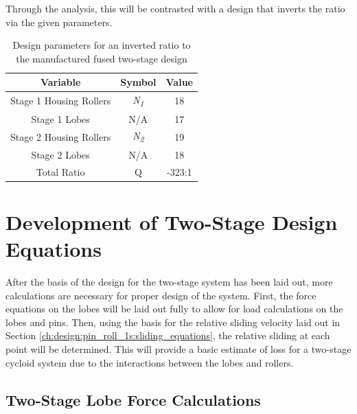 Through the analysis, this will be contrasted with a design that inverts the ratio via the given parameters. 

\begin{table}[h]
  \vskip0.2cm
  \caption{Design parameters for an inverted ratio to the manufactured fused two-stage design}
  \label{table:two_stage_invert_design_params}
  \begin{center}
    \vskip-0.2cm
	\begin{tabular}{|c|c|c|}
		\hline
		Variable & Symbol & Value\\
		\hline
		Stage 1 Housing Rollers & \textit{N\textsubscript{1}} & 18\\
		\hline
		Stage 1 Lobes & N/A & 17\\
		\hline
		Stage 2 Housing Rollers & \textit{N\textsubscript{2}} & 19\\
		\hline
		Stage 2 Lobes & N/A & 18\\
		\hline
		Total Ratio & Q & -323:1 \\
		\hline
	\end{tabular}
  \end{center}
\end{table}



\section{Development of Two-Stage Design Equations} \label{ch:dual:equations}

After the basis of the design for the two-stage system has been laid out, more calculations are necessary for proper design of the system. First, the force equations on the lobes will be laid out fully to allow for load calculations on the lobes and pins. Then, using the basis for the relative sliding velocity laid out in Section \ref{ch:design:pin_roll_1s:sliding_equations}, the relative sliding at each point will be determined. This will provide a basic estimate of loss for a two-stage cycloid system due to the interactions between the lobes and rollers. 

\subsection{Two-Stage Lobe Force Calculations} \label{ch:dual:equtions:force}

